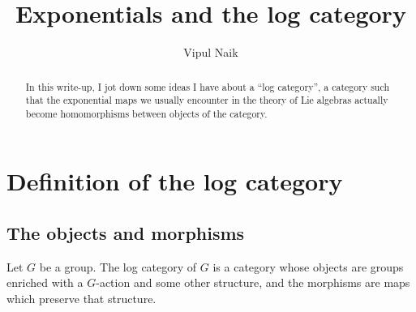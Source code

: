 \documentclass[a4paper]{amsart}
\title{Exponentials and the log category}
\author{Vipul Naik}
\begin{document}
\maketitle

\begin{abstract}
  In this write-up, I jot down some ideas I have about a ``log
  category'', a category such that the exponential maps we usually
  encounter in the theory of Lie algebras actually become
  homomorphisms between objects of the category. 
\end{abstract}

\section{Definition of the log category}

\subsection{The objects and morphisms}

Let $G$ be a group. The log category of $G$ is a category whose
objects are groups enriched with a $G$-action and some other
structure, and the morphisms are maps which preserve that structure.
\end{document}
